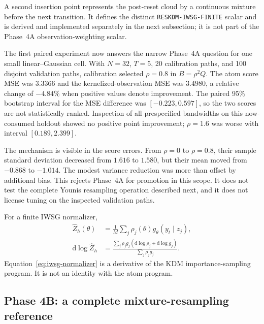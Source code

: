 \documentclass[11pt]{article}
\newcommand{\dd}{\mathrm{d}}
\begin{document}
A second insertion point represents the post-reset cloud by a continuous
mixture before the next transition.  It defines the distinct
\texttt{RESKDM-IWSG-FINITE} scalar and is derived and implemented separately
in the next subsection; it is not part of the Phase~4A
observation-weighting scalar.

The first paired experiment now answers the narrow Phase~4A question for one
small linear--Gaussian cell.  With $N=32$, $T=5$, 20 calibration paths, and
100 disjoint validation paths, calibration selected $\rho=0.8$ in
$B=\rho^2Q$.  The atom score MSE was $3.3366$ and the kernelized-observation
MSE was $3.4980$, a relative change of $-4.84\%$ when positive values denote
improvement.  The paired 95\% bootstrap interval for the MSE difference was
$[-0.223,0.597]$, so the two scores are not statistically ranked.  Inspection
of all prespecified bandwidths on this now-consumed holdout showed no positive
point improvement; $\rho=1.6$ was worse with interval $[0.189,2.399]$.

The mechanism is visible in the score errors.  From $\rho=0$ to $\rho=0.8$,
their sample standard deviation decreased from $1.616$ to $1.580$, but their
mean moved from $-0.868$ to $-1.014$.  The modest variance reduction was more
than offset by additional bias.  This rejects Phase~4A for promotion in this
scope.  It does not test the complete Younis resampling operation described
next, and it does not license tuning on the inspected validation paths.

For a finite IWSG normalizer,
\begin{align}
 \widehat Z_h(\theta)
   &=\frac{1}{M}\sum_j
       \rho_j(\theta)g_\theta(y_t\mid z_j),\\
 \dd\log\widehat Z_h
   &=\frac{\sum_j\rho_jg_j
       \left(\dd\log\rho_j+\dd\log g_j\right)}
           {\sum_j\rho_jg_j}.
 \label{eq:iwsg-normalizer}
\end{align}
Equation~\eqref{eq:iwsg-normalizer} is a derivative of the KDM
importance-sampling program.  It is not an identity with the atom program.

\subsection{Phase 4B: a complete mixture-resampling reference}
\end{document}
